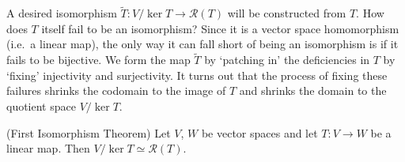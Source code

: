  \vspace{3mm}

 A desired isomorphism \( \widetilde{T}:V/\ker T\to \mathcal{R}(T) \) will be constructed from \( T \). How does \( T \) itself fail to be an isomorphism? Since it is a vector space homomorphism (i.e.\ a linear map), the only way it can fall short of being an isomorphism is if it fails to be bijective. We form the map \( \widetilde{T} \) by `patching in' the deficiencies in \( T \) by `fixing' injectivity and surjectivity. It turns out that the process of fixing these failures shrinks the codomain to the image of \( T \) and shrinks the domain to the quotient space \( V/\ker T \).

  \begin{theorem}
   (First Isomorphism Theorem) Let \( V \), \( W \) be vector spaces and let \( T:V\to W \) be a linear map. Then \( V/\ker T\simeq\mathcal{R}(T) \).
 \end{theorem}
